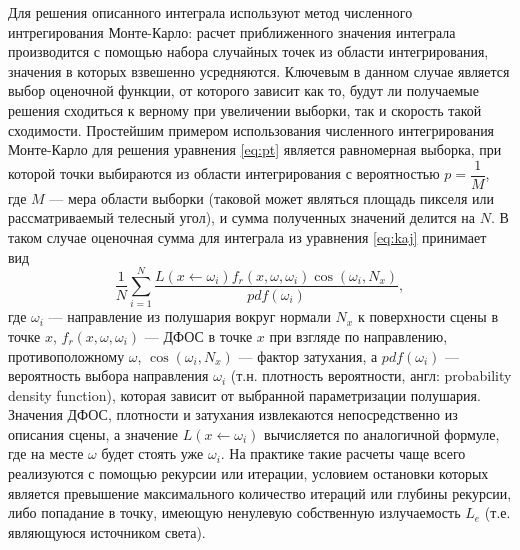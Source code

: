 \documentclass[12pt]{article}
\begin{document}
Для решения описанного интеграла используют метод численного интрегирования Монте-Карло: расчет приближенного значения интеграла производится с помощью набора случайных точек из области интегрирования, значения в которых взвешенно усредняются. Ключевым в данном случае является выбор оценочной функции, от которого зависит как то, будут ли получаемые решения сходиться к верному при увеличении выборки, так и скорость такой сходимости. Простейшим примером использования численного интегрирования Монте-Карло для решения уравнения \eqref{eq:pt} является равномерная выборка, при которой точки выбираются из области интегрирования с вероятностью $p = \dfrac{1}{M}$, где $M$ --- мера области выборки (таковой может являться площадь пикселя или рассматриваемый телесный угол), и сумма полученных значений делится на $N$. В таком случае оценочная сумма для интеграла из уравнения \eqref{eq:kaj} принимает вид
\begin{equation}
\frac{1}{N} \sum_{i = 1}^{N} \frac{L(x \leftarrow \omega_i) f_r(x, \omega, \omega_i) \cos(\omega_i, N_x)}{pdf(\omega_i)}, \label{eq:mc-kaj}
\end{equation}
где $\omega_i$ --- направление из полушария вокруг нормали $N_x$ к поверхности сцены в точке $x$, $f_r(x, \omega, \omega_i)$ --- ДФОС в точке $x$ при взгляде по направлению, противоположному $\omega$, $\cos(\omega_i, N_x)$ --- фактор затухания, а $pdf(\omega_i)$ --- вероятность выбора направления $\omega_i$ (т.н. плотность вероятности, англ: probability density function), которая зависит от выбранной параметризации полушария. Значения ДФОС, плотности и затухания извлекаются непосредственно из описания сцены, а значение $L(x \leftarrow \omega_i)$ вычисляется по аналогичной формуле, где на месте $\omega$ будет стоять уже $\omega_i$. На практике такие расчеты чаще всего реализуются с помощью рекурсии или итерации, условием остановки которых является превышение максимального количество итераций или глубины рекурсии, либо попадание в точку, имеющую ненулевую собственную излучаемость $L_e$ (т.е. являющуюся источником света).
\end{document}
